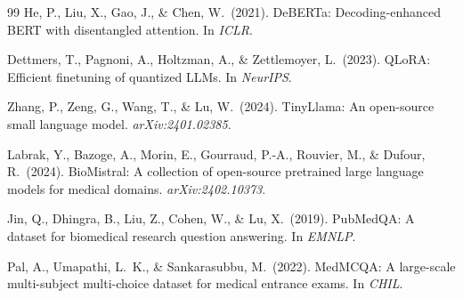 \documentclass[10pt,twocolumn]{article}
\begin{document}
\begin{thebibliography}{99}
He, P., Liu, X., Gao, J., \& Chen, W.\ (2021).
\newblock DeBERTa: Decoding-enhanced BERT with disentangled attention.
\newblock In \emph{ICLR}.

Dettmers, T., Pagnoni, A., Holtzman, A., \& Zettlemoyer, L.\ (2023).
\newblock QLoRA: Efficient finetuning of quantized LLMs.
\newblock In \emph{NeurIPS}.

Zhang, P., Zeng, G., Wang, T., \& Lu, W.\ (2024).
\newblock TinyLlama: An open-source small language model.
\newblock \emph{arXiv:2401.02385}.

Labrak, Y., Bazoge, A., Morin, E., Gourraud, P.-A., Rouvier, M.,
  \& Dufour, R.\ (2024).
\newblock BioMistral: A collection of open-source pretrained large language
  models for medical domains.
\newblock \emph{arXiv:2402.10373}.

Jin, Q., Dhingra, B., Liu, Z., Cohen, W., \& Lu, X.\ (2019).
\newblock PubMedQA: A dataset for biomedical research question answering.
\newblock In \emph{EMNLP}.

Pal, A., Umapathi, L.~K., \& Sankarasubbu, M.\ (2022).
\newblock MedMCQA: A large-scale multi-subject multi-choice dataset for
  medical entrance exams.
\newblock In \emph{CHIL}.

\end{thebibliography}
\end{document}
